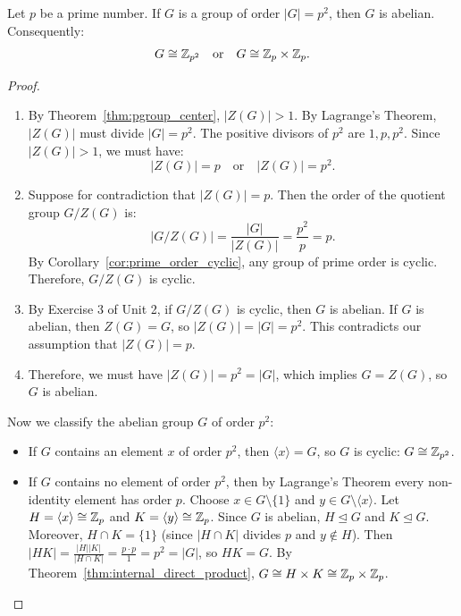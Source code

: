 \begin{theorem}
\label{thm:groups_order_p2}
Let $p$ be a prime number. If $G$ is a group of order $|G| = p^2$, then $G$ is abelian. Consequently:
\begin{equation}
G \cong \mathbb{Z}_{p^2} \quad \text{or} \quad G \cong \mathbb{Z}_p \times \mathbb{Z}_p.
\end{equation}
\end{theorem}

\begin{proof}
\begin{enumerate}[label=\arabic*., leftmargin=*]
    \item By Theorem~\ref{thm:pgroup_center}, $|Z(G)| > 1$.
    By Lagrange's Theorem, $|Z(G)|$ must divide $|G| = p^2$.
    The positive divisors of $p^2$ are $1, p, p^2$.
    Since $|Z(G)| > 1$, we must have:
    \begin{equation*}
    |Z(G)| = p \quad \text{or} \quad |Z(G)| = p^2.
    \end{equation*}

    \item Suppose for contradiction that $|Z(G)| = p$.
    Then the order of the quotient group $G/Z(G)$ is:
    \begin{equation*}
    |G/Z(G)| = \frac{|G|}{|Z(G)|} = \frac{p^2}{p} = p.
    \end{equation*}
    By Corollary~\ref{cor:prime_order_cyclic}, any group of prime order is cyclic.
    Therefore, $G/Z(G)$ is cyclic.

    \item By Exercise 3 of Unit 2, if $G/Z(G)$ is cyclic, then $G$ is abelian.
    If $G$ is abelian, then $Z(G) = G$, so $|Z(G)| = |G| = p^2$.
    This contradicts our assumption that $|Z(G)| = p$.

    \item Therefore, we must have $|Z(G)| = p^2 = |G|$, which implies $G = Z(G)$, so $G$ is abelian.
\end{enumerate}
Now we classify the abelian group $G$ of order $p^2$:
\begin{itemize}[leftmargin=1.5em, itemsep=4pt]
    \item If $G$ contains an element $x$ of order $p^2$, then $\langle x \rangle = G$, so $G$ is cyclic: $G \cong \mathbb{Z}_{p^2}$.
    \item If $G$ contains no element of order $p^2$, then by Lagrange's Theorem every non-identity element has order $p$.
    Choose $x \in G \setminus \{1\}$ and $y \in G \setminus \langle x \rangle$.
    Let $H = \langle x \rangle \cong \mathbb{Z}_p$ and $K = \langle y \rangle \cong \mathbb{Z}_p$.
    Since $G$ is abelian, $H \trianglelefteq G$ and $K \trianglelefteq G$.
    Moreover, $H \cap K = \{1\}$ (since $|H \cap K|$ divides $p$ and $y \notin H$).
    Then $|HK| = \frac{|H||K|}{|H \cap K|} = \frac{p \cdot p}{1} = p^2 = |G|$, so $HK = G$.
    By Theorem~\ref{thm:internal_direct_product}, $G \cong H \times K \cong \mathbb{Z}_p \times \mathbb{Z}_p$.
\end{itemize}
\end{proof}

